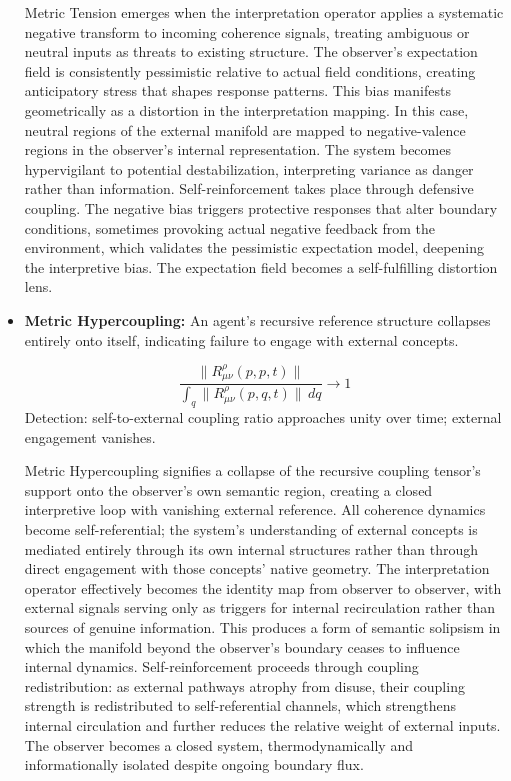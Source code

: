 \begin{itemize}
    Metric Tension emerges when the interpretation operator applies a systematic negative transform to incoming coherence signals, treating ambiguous or neutral inputs as threats to existing structure. The observer's expectation field is consistently pessimistic relative to actual field conditions, creating anticipatory stress that shapes response patterns. This bias manifests geometrically as a distortion in the interpretation mapping. In this case, neutral regions of the external manifold are mapped to negative-valence regions in the observer's internal representation. The system becomes hypervigilant to potential destabilization, interpreting variance as danger rather than information. Self-reinforcement takes place through defensive coupling. The negative bias triggers protective responses that alter boundary conditions, sometimes provoking actual negative feedback from the environment, which validates the pessimistic expectation model, deepening the interpretive bias. The expectation field becomes a self-fulfilling distortion lens.

    \item \textbf{Metric Hypercoupling:} An agent's recursive reference structure collapses entirely onto itself, indicating failure to engage with external concepts.

    \begin{equation}
    \frac{\|R^\rho_{\mu\nu}(p,p,t)\|}{\int_q \|R^\rho_{\mu\nu}(p,q,t)\| \, dq} \to 1
    \end{equation}
    Detection: self-to-external coupling ratio approaches unity over time; external engagement vanishes.

    Metric Hypercoupling signifies a collapse of the recursive coupling tensor's support onto the observer's own semantic region, creating a closed interpretive loop with vanishing external reference. All coherence dynamics become self-referential; the system's understanding of external concepts is mediated entirely through its own internal structures rather than through direct engagement with those concepts' native geometry. The interpretation operator effectively becomes the identity map from observer to observer, with external signals serving only as triggers for internal recirculation rather than sources of genuine information. This produces a form of semantic solipsism in which the manifold beyond the observer's boundary ceases to influence internal dynamics. Self-reinforcement proceeds through coupling redistribution: as external pathways atrophy from disuse, their coupling strength is redistributed to self-referential channels, which strengthens internal circulation and further reduces the relative weight of external inputs. The observer becomes a closed system, thermodynamically and informationally isolated despite ongoing boundary flux.

\end{itemize}

